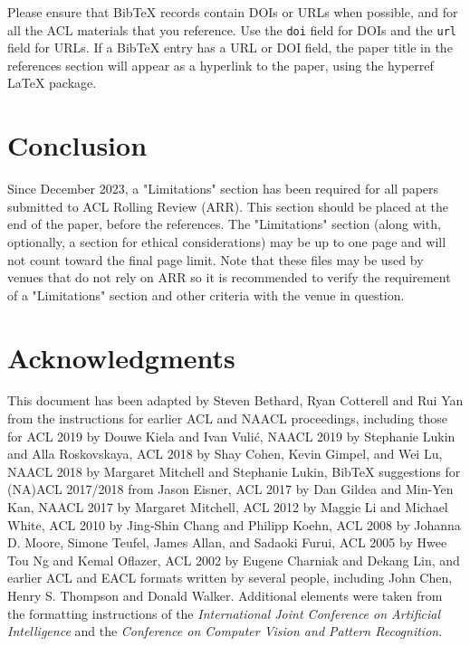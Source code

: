 \documentclass[11pt]{article}
\begin{document}
Please ensure that Bib\TeX{} records contain DOIs or URLs when possible, and for all the ACL materials that you reference.
Use the \verb|doi| field for DOIs and the \verb|url| field for URLs.
If a Bib\TeX{} entry has a URL or DOI field, the paper title in the references section will appear as a hyperlink to the paper, using the hyperref \LaTeX{} package.

\section*{Conclusion}

Since December 2023, a "Limitations" section has been required for all papers submitted to ACL Rolling Review (ARR). This section should be placed at the end of the paper, before the references. The "Limitations" section (along with, optionally, a section for ethical considerations) may be up to one page and will not count toward the final page limit. Note that these files may be used by venues that do not rely on ARR so it is recommended to verify the requirement of a "Limitations" section and other criteria with the venue in question.

\section*{Acknowledgments}

This document has been adapted
by Steven Bethard, Ryan Cotterell and Rui Yan
from the instructions for earlier ACL and NAACL proceedings, including those for
ACL 2019 by Douwe Kiela and Ivan Vuli\'{c},
NAACL 2019 by Stephanie Lukin and Alla Roskovskaya,
ACL 2018 by Shay Cohen, Kevin Gimpel, and Wei Lu,
NAACL 2018 by Margaret Mitchell and Stephanie Lukin,
Bib\TeX{} suggestions for (NA)ACL 2017/2018 from Jason Eisner,
ACL 2017 by Dan Gildea and Min-Yen Kan,
NAACL 2017 by Margaret Mitchell,
ACL 2012 by Maggie Li and Michael White,
ACL 2010 by Jing-Shin Chang and Philipp Koehn,
ACL 2008 by Johanna D. Moore, Simone Teufel, James Allan, and Sadaoki Furui,
ACL 2005 by Hwee Tou Ng and Kemal Oflazer,
ACL 2002 by Eugene Charniak and Dekang Lin,
and earlier ACL and EACL formats written by several people, including
John Chen, Henry S. Thompson and Donald Walker.
Additional elements were taken from the formatting instructions of the \emph{International Joint Conference on Artificial Intelligence} and the \emph{Conference on Computer Vision and Pattern Recognition}.

%

\end{document}
